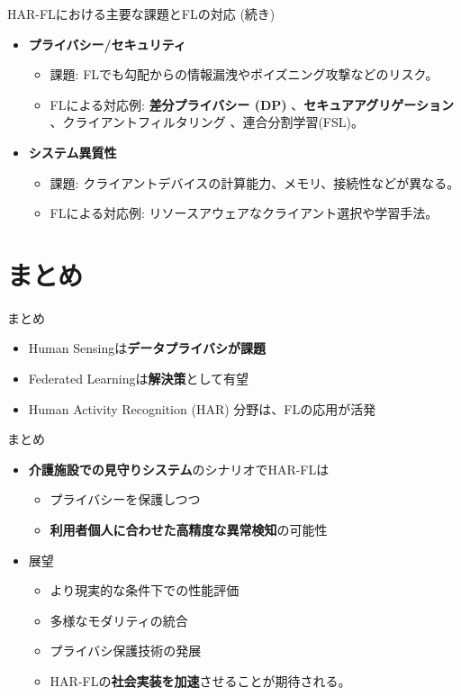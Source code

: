 \documentclass[unicode,12pt,aspectratio=169,dvipdfmx]{beamer}
\begin{document}
\begin{frame}{HAR-FLにおける主要な課題とFLの対応 (続き)}
    \begin{itemize}
        \item \textbf{プライバシー/セキュリティ}
        \begin{itemize}
            \item 課題: FLでも勾配からの情報漏洩やポイズニング攻撃などのリスク。
            \item FLによる対応例: \textbf{差分プライバシー (DP)} 、\textbf{セキュアアグリゲーション} 、クライアントフィルタリング 、連合分割学習(FSL)。
        \end{itemize}
        \item \textbf{システム異質性}
        \begin{itemize}
            \item 課題: クライアントデバイスの計算能力、メモリ、接続性などが異なる。
            \item FLによる対応例: リソースアウェアなクライアント選択や学習手法。
        \end{itemize}
    \end{itemize}
\end{frame}

\section{まとめ}
\begin{frame}{まとめ}
    \begin{itemize}
        \item Human Sensingは\textbf{データプライバシが課題}
        \item Federated Learningは\textbf{解決策}として有望
        \item Human Activity Recognition (HAR) 分野は、FLの応用が活発
    \end{itemize}
\end{frame}

\begin{frame}{まとめ}
    \begin{itemize}
        \item \textbf{介護施設での見守りシステム}のシナリオでHAR-FLは
        \begin{itemize}
            \item プライバシーを保護しつつ
            \item \textbf{利用者個人に合わせた高精度な異常検知}の可能性
        \end{itemize}
        \item 展望
        \begin{itemize}
            \item より現実的な条件下での性能評価
            \item 多様なモダリティの統合
            \item プライバシ保護技術の発展
            \item HAR-FLの\textbf{社会実装を加速}させることが期待される。
        \end{itemize}
    \end{itemize}
\end{frame}
\end{document}
